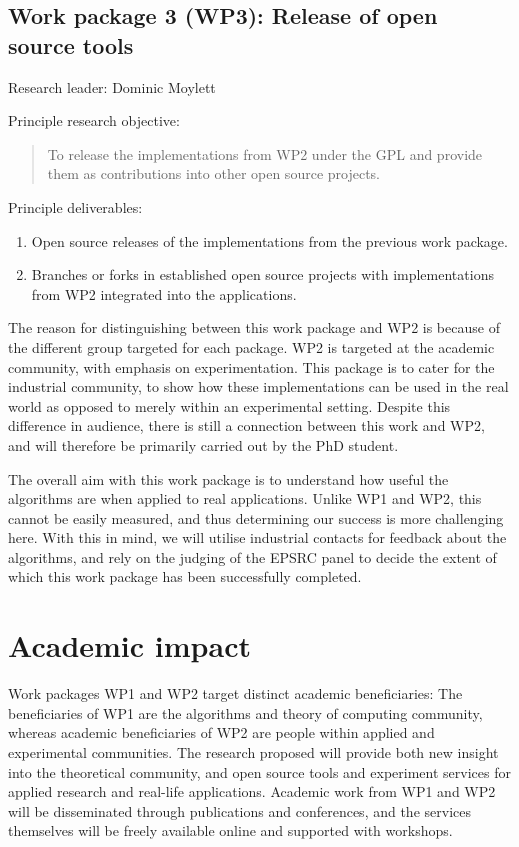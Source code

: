 \documentclass[a4paper,11pt]{article}
\begin{document}
    \subsection*{Work package 3 (WP3): Release of open source tools}

    Research leader: Dominic Moylett

    Principle research objective:
    \begin{quote}
        To release the implementations from WP2 under the GPL and provide them as contributions into other open source projects.
    \end{quote}

    Principle deliverables:
    \begin{enumerate}
        \item Open source releases of the implementations from the previous work package.
        \item Branches or forks in established open source projects with implementations from WP2 integrated into the applications.
    \end{enumerate}

    The reason for distinguishing between this work package and WP2 is because of the different group targeted for each package. WP2 is targeted at the academic community, with emphasis on experimentation. This package is to cater for the industrial community, to show how these implementations can be used in the real world as opposed to merely within an experimental setting. Despite this difference in audience, there is still a connection between this work and WP2, and will therefore be primarily carried out by the PhD student.

    The overall aim with this work package is to understand how useful the algorithms are when applied to real applications. Unlike WP1 and WP2, this cannot be easily measured, and thus determining our success is more challenging here. With this in mind, we will utilise industrial contacts for feedback about the algorithms, and rely on the judging of the EPSRC panel to decide the extent of which this work package has been successfully completed.

    \section{Academic impact}

    Work packages WP1 and WP2 target distinct academic beneficiaries: The beneficiaries of WP1 are the algorithms and theory of computing community, whereas academic beneficiaries of WP2 are people within applied and experimental communities. The research proposed will provide both new insight into the theoretical community, and open source tools and experiment services for applied research and real-life applications. Academic work from WP1 and WP2 will be disseminated through publications and conferences, and the services themselves will be freely available online and supported with workshops.
    
\end{document}
